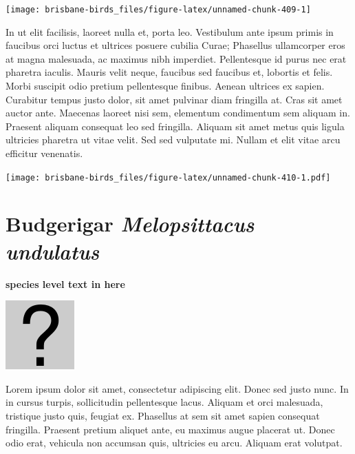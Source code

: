 \documentclass[]{book}
\let\origfigure\figure
\let\endorigfigure\endfigure
\renewenvironment{figure}[1][2] {
  \expandafter\origfigure\expandafter[H]
} {
  \endorigfigure
}
\begin{document}
\begin{figure}
\texttt{[image: brisbane-birds\_files/figure-latex/unnamed-chunk-409-1]} \caption{insert figure caption}\label{fig:unnamed-chunk-409}
\end{figure}

In ut elit facilisis, laoreet nulla et, porta leo. Vestibulum ante ipsum
primis in faucibus orci luctus et ultrices posuere cubilia Curae;
Phasellus ullamcorper eros at magna malesuada, ac maximus nibh
imperdiet. Pellentesque id purus nec erat pharetra iaculis. Mauris velit
neque, faucibus sed faucibus et, lobortis et felis. Morbi suscipit odio
pretium pellentesque finibus. Aenean ultrices ex sapien. Curabitur
tempus justo dolor, sit amet pulvinar diam fringilla at. Cras sit amet
auctor ante. Maecenas laoreet nisi sem, elementum condimentum sem
aliquam in. Praesent aliquam consequat leo sed fringilla. Aliquam sit
amet metus quis ligula ultricies pharetra ut vitae velit. Sed sed
vulputate mi. Nullam et elit vitae arcu efficitur venenatis.

\begin{figure}
\centering
\texttt{[image: brisbane-birds\_files/figure-latex/unnamed-chunk-410-1.pdf]}
\caption{\label{fig:unnamed-chunk-410}insert figure caption}
\end{figure}

\section{\texorpdfstring{Budgerigar \emph{Melopsittacus
undulatus}}{Budgerigar Melopsittacus undulatus}}\label{budgerigar-melopsittacus-undulatus}

\textbf{species level text in here}

\begin{figure}
\centering
\includegraphics{assets/missing.png}
\caption{No image for species}
\end{figure}

Lorem ipsum dolor sit amet, consectetur adipiscing elit. Donec sed justo
nunc. In in cursus turpis, sollicitudin pellentesque lacus. Aliquam et
orci malesuada, tristique justo quis, feugiat ex. Phasellus at sem sit
amet sapien consequat fringilla. Praesent pretium aliquet ante, eu
maximus augue placerat ut. Donec odio erat, vehicula non accumsan quis,
ultricies eu arcu. Aliquam erat volutpat.
\end{document}
